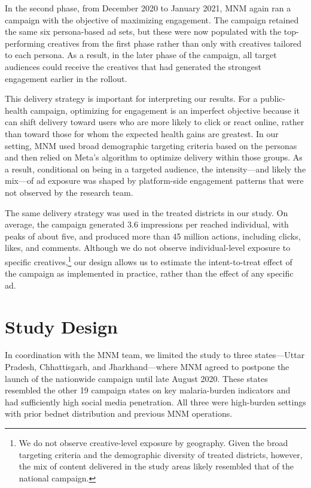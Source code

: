 In the second phase, from December 2020 to January 2021, MNM again ran a campaign with the objective of maximizing engagement. The campaign retained the same six persona-based ad sets, but these were now populated with the top-performing creatives from the first phase rather than only with creatives tailored to each persona. As a result, in the later phase of the campaign, all target audiences could receive the creatives that had generated the strongest engagement earlier in the rollout.

This delivery strategy is important for interpreting our results. For a public-health campaign, optimizing for engagement is an imperfect objective because it can shift delivery toward users who are more likely to click or react online, rather than toward those for whom the expected health gains are greatest. In our setting, MNM used broad demographic targeting criteria based on the personas and then relied on Meta’s algorithm to optimize delivery within those groups. As a result, conditional on being in a targeted audience, the intensity---and likely the mix---of ad exposure was shaped by platform-side engagement patterns that were not observed by the research team.

The same delivery strategy was used in the treated districts in our study. On average, the campaign generated 3.6 impressions per reached individual, with peaks of about five, and produced more than 45 million actions, including clicks, likes, and comments. Although we do not observe individual-level exposure to specific creatives,\footnote{We do not observe creative-level exposure by geography. Given the broad targeting criteria and the demographic diversity of treated districts, however, the mix of content delivered in the study areas likely resembled that of the national campaign.} our design allows us to estimate the intent-to-treat effect of the campaign as implemented in practice, rather than the effect of any specific ad.

 


\section{Study Design}

In coordination with the MNM team, we limited the study to three states---Uttar Pradesh, Chhattisgarh, and Jharkhand---where MNM agreed to postpone the launch of the nationwide campaign until late August 2020. These states resembled the other 19 campaign states on key malaria-burden indicators and had sufficiently high social media penetration. All three were high-burden settings with prior bednet distribution and previous MNM operations.

